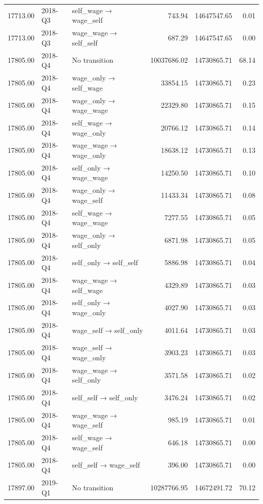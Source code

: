 \begin{table}[ht]
{\begin{tabular}{rllrrr}
  17713.00 & 2018-Q3 & self\_wage → wage\_self & 743.94 & 14647547.65 & 0.01 \\ 
  17713.00 & 2018-Q3 & wage\_wage → self\_self & 687.29 & 14647547.65 & 0.00 \\ 
  17805.00 & 2018-Q4 & No transition & 10037686.02 & 14730865.71 & 68.14 \\ 
  17805.00 & 2018-Q4 & wage\_only → self\_wage & 33854.15 & 14730865.71 & 0.23 \\ 
  17805.00 & 2018-Q4 & wage\_only → wage\_wage & 22329.80 & 14730865.71 & 0.15 \\ 
  17805.00 & 2018-Q4 & self\_wage → wage\_only & 20766.12 & 14730865.71 & 0.14 \\ 
  17805.00 & 2018-Q4 & wage\_wage → wage\_only & 18638.12 & 14730865.71 & 0.13 \\ 
  17805.00 & 2018-Q4 & self\_only → wage\_wage & 14250.50 & 14730865.71 & 0.10 \\ 
  17805.00 & 2018-Q4 & wage\_only → wage\_self & 11433.34 & 14730865.71 & 0.08 \\ 
  17805.00 & 2018-Q4 & self\_wage → wage\_wage & 7277.55 & 14730865.71 & 0.05 \\ 
  17805.00 & 2018-Q4 & wage\_only → self\_only & 6871.98 & 14730865.71 & 0.05 \\ 
  17805.00 & 2018-Q4 & self\_only → self\_self & 5886.98 & 14730865.71 & 0.04 \\ 
  17805.00 & 2018-Q4 & wage\_wage → self\_wage & 4329.89 & 14730865.71 & 0.03 \\ 
  17805.00 & 2018-Q4 & self\_only → wage\_only & 4027.90 & 14730865.71 & 0.03 \\ 
  17805.00 & 2018-Q4 & wage\_self → self\_only & 4011.64 & 14730865.71 & 0.03 \\ 
  17805.00 & 2018-Q4 & wage\_self → wage\_only & 3903.23 & 14730865.71 & 0.03 \\ 
  17805.00 & 2018-Q4 & wage\_wage → self\_only & 3571.58 & 14730865.71 & 0.02 \\ 
  17805.00 & 2018-Q4 & self\_self → self\_only & 3476.24 & 14730865.71 & 0.02 \\ 
  17805.00 & 2018-Q4 & wage\_wage → wage\_self & 985.19 & 14730865.71 & 0.01 \\ 
  17805.00 & 2018-Q4 & self\_wage → wage\_self & 646.18 & 14730865.71 & 0.00 \\ 
  17805.00 & 2018-Q4 & self\_self → wage\_self & 396.00 & 14730865.71 & 0.00 \\ 
  17897.00 & 2019-Q1 & No transition & 10287766.95 & 14672491.72 & 70.12 \\ 

\end{tabular}}
\end{table}
